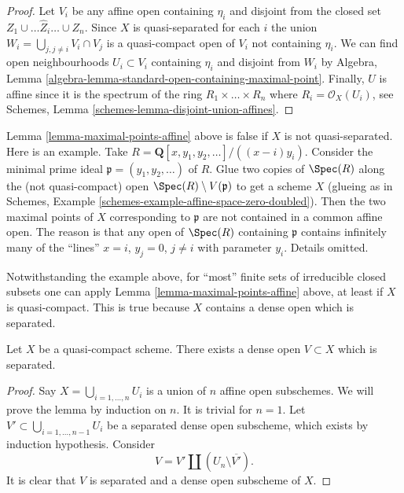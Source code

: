 \begin{proof}
Let $V_i$ be any affine open containing $\eta_i$
and disjoint from the closed set $Z_1 \cup \ldots \hat Z_i \ldots \cup Z_n$.
Since $X$ is quasi-separated for each $i$ the union
$W_i = \bigcup_{j, j \not = i} V_i \cap V_j$ is a quasi-compact
open of $V_i$ not containing $\eta_i$.
We can find open neighbourhoods $U_i \subset V_i$
containing $\eta_i$ and disjoint from $W_i$ by
Algebra, Lemma \ref{algebra-lemma-standard-open-containing-maximal-point}.
Finally, $U$ is affine since it is the spectrum of
the ring $R_1 \times \ldots \times R_n$ where $R_i = \mathcal{O}_X(U_i)$,
see Schemes, Lemma \ref{schemes-lemma-disjoint-union-affines}.
\end{proof}

\begin{remark}
\label{remark-maximal-points-affine}
Lemma \ref{lemma-maximal-points-affine} above is false if $X$
is not quasi-separated. Here is an example. Take
$R = \mathbf{Q}[x, y_1, y_2, \ldots]/((x-i)y_i)$.
Consider the minimal prime ideal $\mathfrak p = (y_1, y_2, \ldots)$
of $R$. Glue two copies of $\Spec(R)$ along the
(not quasi-compact) open $\Spec(R) \setminus V(\mathfrak p)$
to get a scheme $X$ (glueing as in
Schemes, Example \ref{schemes-example-affine-space-zero-doubled}).
Then the two maximal points of $X$ corresponding to $\mathfrak p$
are not contained in a common affine open. The reason is
that any open of $\Spec(R)$ containing $\mathfrak p$
contains infinitely many of the ``lines'' $x = i$, $y_j = 0$,
$j \not = i$ with parameter $y_i$. Details omitted.
\end{remark}

\noindent
Notwithstanding the example above, for ``most'' finite sets of irreducible
closed subsets one can apply Lemma \ref{lemma-maximal-points-affine} above,
at least if $X$ is quasi-compact. This is true because $X$ contains a dense
open which is separated.

\begin{lemma}
\label{lemma-quasi-compact-dense-open-separated}
Let $X$ be a quasi-compact scheme.
There exists a dense open $V \subset X$ which is separated.
\end{lemma}

\begin{proof}
Say $X = \bigcup_{i = 1, \ldots, n} U_i$ is a union of $n$ affine open
subschemes. We will prove the lemma by induction on $n$. It is trivial for
$n = 1$. Let $V' \subset \bigcup_{i = 1, \ldots, n - 1} U_i$ be a separated
dense open subscheme, which exists by induction hypothesis. Consider
$$
V = V' \amalg (U_n \setminus \overline{V'}).
$$
It is clear that $V$ is separated and a dense open subscheme of $X$.
\end{proof}


